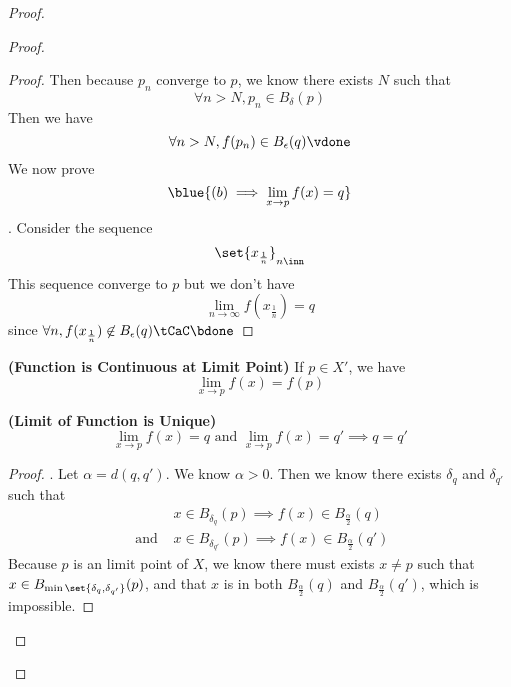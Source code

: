 \documentclass{report}
\begin{document}
\begin{proof}
\begin{proof}
\begin{proof}
Then because $p_n$ converge to $p$, we know there exists  $N$ such that 
\begin{equation*}
\forall n>N, p_n\in B_{\delta }(p)
\end{equation*}
Then we have 
\begin{equation*}
\forall n>N,f(p_n)\in B_\epsilon (q)\vdone
\end{equation*}
We now prove 
\begin{equation*}
\blue{(b)\implies \lim_{x\to p}f(x)=q}
\end{equation*}
. Consider the sequence 
\begin{equation*}
\set{x_{\frac{1}{n}}}_{n\inn}
\end{equation*}
This sequence converge to $p$ but we don't have 
\begin{equation*}
\lim_{n\to\infty}f(x_{\frac{1}{n}})=q
\end{equation*}
since $\forall n, f(x_{\frac{1}{n}})\not\in B_\epsilon (q)\tCaC\bdone$ 
\end{proof}
\begin{corollary}
\label{3.11.3}
\textbf{(Function is Continuous at Limit Point)} If $p\in X'$, we have
\begin{equation*}
\lim_{x\to p}f(x)=f(p)
\end{equation*}
\end{corollary}
\begin{theorem}
\label{3.11.4}
\textbf{(Limit of Function is Unique)} 
\begin{equation*}
\lim_{x\to p}f(x)=q\text{ and }\lim_{x \to p}f(x)=q'\implies q=q'
\end{equation*}
\end{theorem}
\begin{proof}
. Let $\alpha =d(q,q')$. We know $\alpha >0$. Then we know there exists $\delta_q$ and $\delta_{q'}$ such that 
\begin{align*}
&x\in B_{\delta_q}(p)\implies f(x)\in B_{\frac{\alpha}{2}}(q)\\
\text{ and }&x\in B_{\delta_{q'}}(p)\implies f(x)\in B_{\frac{\alpha}{2}} (q')
\end{align*}
Because $p$ is an limit point of $X$, we know there must exists $x\neq p$ such that $x\in B_{\min \set{\delta_q,\delta_{q'}}}(p)$, and that $x$ is in both $B_{\frac{\alpha }{2}}(q)$ and $B_{\frac{\alpha}{2}}(q')$, which is impossible. \CaC
\end{proof}

\end{proof}
\end{proof}
\end{document}
